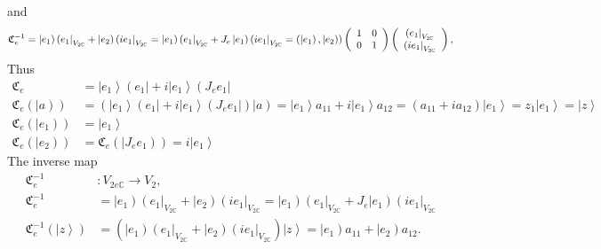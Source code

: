 \documentclass[aps,preprint]{revtex4}%
\begin{document}
and%
\begin{equation}
\mathfrak{C}_{e}^{-1}=\left\vert e_{1}\right)  \left(  e_{1}\right\vert
_{V_{2\mathbb{C}}}+\left\vert e_{2}\right)  \left(  ie_{1}\right\vert
_{V_{2\mathbb{C}}}=\left\vert e_{1}\right)  \left(  e_{1}\right\vert
_{V_{2\mathbb{C}}}+J_{e}\left\vert e_{1}\right)  \left(  ie_{1}\right\vert
_{V_{2\mathbb{C}}}=\left(  \left\vert e_{1}\right)  ,\left\vert e_{2}\right)
\right)  \left(
\begin{array}
[c]{cc}%
1 & 0\\
0 & 1
\end{array}
\right)  \left(
\begin{array}
[c]{c}%
\left(  e_{1}\right\vert _{V_{2\mathbb{C}}}\\
\left(  ie_{1}\right\vert _{V_{2\mathbb{C}}}%
\end{array}
\right)  ,
\end{equation}
Thus
\begin{align}
\mathfrak{C}_{e}  &  =\left\vert e_{1}\right\rangle \left(  e_{1}\right\vert
+i\left\vert e_{1}\right\rangle \left(  J_{e}e_{1}\right\vert \\
\mathfrak{C}_{e}\left(  \left\vert a\right)  \right)   &  =\left(  \left\vert
e_{1}\right\rangle \left(  e_{1}\right\vert +i\left\vert e_{1}\right\rangle
\left(  J_{e}e_{1}\right\vert \right)  \left\vert a\right)  =\left\vert
e_{1}\right\rangle a_{11}+i\left\vert e_{1}\right\rangle a_{12}=\left(
a_{11}+ia_{12}\right)  \left\vert e_{1}\right\rangle =z_{1}\left\vert
e_{1}\right\rangle =\left\vert z\right\rangle \\
\mathfrak{C}_{e}\left(  \left\vert e_{1}\right)  \right)   &  =\left\vert
e_{1}\right\rangle \\
\mathfrak{C}_{e}\left(  \left\vert e_{2}\right)  \right)   &  =\mathfrak{C}%
_{e}\left(  \left\vert J_{e}e_{1}\right)  \right)  =i\left\vert e_{1}%
\right\rangle
\end{align}
The inverse map
\begin{align}
\mathfrak{C}_{e}^{-1}  &  :V_{2e\mathbb{C}}\rightarrow V_{2},\\
\mathfrak{C}_{e}^{-1}  &  =\left\vert e_{1}\right)  \left(  e_{1}\right\vert
_{V_{2\mathbb{C}}}+\left\vert e_{2}\right)  \left(  ie_{1}\right\vert
_{V_{2\mathbb{C}}}=\left\vert e_{1}\right)  \left(  e_{1}\right\vert
_{V_{2\mathbb{C}}}+J_{e}\left\vert e_{1}\right)  \left(  ie_{1}\right\vert
_{V_{2\mathbb{C}}}\\
\mathfrak{C}_{e}^{-1}\left(  \left\vert z\right\rangle \right)   &  =\left(
\left\vert e_{1}\right)  \left(  e_{1}\right\vert _{V_{2\mathbb{C}}%
}+\left\vert e_{2}\right)  \left(  ie_{1}\right\vert _{V_{2\mathbb{C}}%
}\right)  \left\vert z\right\rangle =\left\vert e_{1}\right)  a_{11}%
+\left\vert e_{2}\right)  a_{12}.
\end{align}
\end{document}
